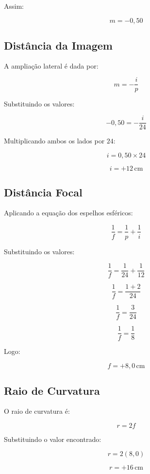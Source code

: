 \documentclass[12pt,a4paper]{article}
\begin{document}
Assim:

\[
m = -0,50
\]


\subsection*{Distância da Imagem}

A ampliação lateral é dada por:

\[
m = -\frac{i}{p}
\]

Substituindo os valores:

\[
-0,50 = -\frac{i}{24}
\]

Multiplicando ambos os lados por $24$:

\[
i = 0,50 \times 24
\]

\[
i = +12\,\text{cm}
\]


\subsection*{Distância Focal}

Aplicando a equação dos espelhos esféricos:

\[
\frac{1}{f} = \frac{1}{p} + \frac{1}{i}
\]

Substituindo os valores:

\[
\frac{1}{f}
=
\frac{1}{24}
+
\frac{1}{12}
\]

\[
\frac{1}{f}
=
\frac{1 + 2}{24}
\]

\[
\frac{1}{f}
=
\frac{3}{24}
\]

\[
\frac{1}{f}
=
\frac{1}{8}
\]

Logo:

\[
f = +8,0\,\text{cm}
\]


\subsection*{Raio de Curvatura}

O raio de curvatura é:

\[
r = 2f
\]

Substituindo o valor encontrado:

\[
r = 2(8,0)
\]

\[
r = +16\,\text{cm}
\]

\end{document}
